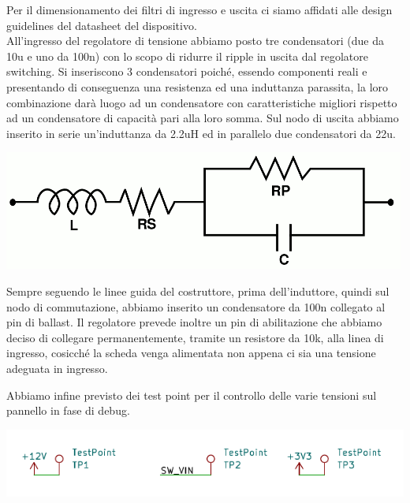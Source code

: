 Per il dimensionamento dei filtri di ingresso e uscita ci siamo affidati alle 
design guidelines del datasheet del dispositivo.\\
All'ingresso del regolatore di tensione abbiamo posto tre condensatori
(due da 10u e uno da 100n) con lo scopo di ridurre il ripple in uscita dal regolatore switching. 
Si inseriscono 3 condensatori poiché, essendo
componenti reali e presentando di conseguenza una resistenza ed una
induttanza parassita, la loro combinazione darà luogo ad un condensatore
con caratteristiche migliori rispetto ad un condensatore di capacità
pari alla loro somma.
Sul nodo di uscita abbiamo inserito in serie 
un’induttanza da 2.2uH ed in parallelo due condensatori da 22u.

\begin{center}
\includegraphics[scale=0.8]{figures/image37.png}
\captionsetup{type=figure}
\end{center}

Sempre seguendo le linee guida del costruttore, prima dell’induttore, 
quindi sul nodo di commutazione, abbiamo inserito un condensatore da 100n collegato al pin di ballast.
Il regolatore prevede inoltre un pin di abilitazione che abbiamo deciso di collegare permanentemente, 
tramite un resistore da 10k, alla linea di ingresso, cosicché la scheda venga alimentata non appena ci 
sia una tensione adeguata in ingresso.

Abbiamo infine previsto dei test point per il controllo delle varie
tensioni sul pannello in fase di debug.

\begin{center}
\includegraphics[scale=1]{figures/image78.png}
\captionsetup{type=figure}
\end{center}

